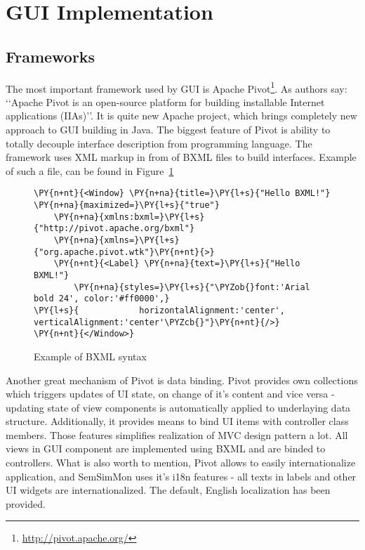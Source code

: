 \section{GUI Implementation}

\subsection{Frameworks}

The most important framework used by GUI is Apache Pivot\footnote{\url{http://pivot.apache.org/}}. As authors say:
\lq\lq{}Apache Pivot is an open-source platform for building installable Internet applications (IIAs)\rq\rq{}. It is quite new Apache
project, which brings completely new approach to GUI building in Java. The biggest feature of Pivot is ability to totally
decouple interface description from programming language. The framework uses XML markup in from of BXML files to build
interfaces. Example of such a file, can be found in Figure~\ref{fig:bxml_example}
 
\begin{figure}[ht]
  \centering
    
\begin{Verbatim}[commandchars=\\\{\},frame=single,framerule=0.2pt]                                                     
\PY{n+nt}{<Window} \PY{n+na}{title=}\PY{l+s}{"Hello BXML!"} \PY{n+na}{maximized=}\PY{l+s}{"true"}                      
    \PY{n+na}{xmlns:bxml=}\PY{l+s}{"http://pivot.apache.org/bxml"}                                                      
    \PY{n+na}{xmlns=}\PY{l+s}{"org.apache.pivot.wtk"}\PY{n+nt}{>}                                                       
    \PY{n+nt}{<Label} \PY{n+na}{text=}\PY{l+s}{"Hello BXML!"}                                                           
        \PY{n+na}{styles=}\PY{l+s}{"\PYZob{}font:'Arial bold 24', color:'#ff0000',}                                     
\PY{l+s}{            horizontalAlignment:'center', verticalAlignment:'center'\PYZcb{}"}\PY{n+nt}{/>}                    
\PY{n+nt}{</Window>}                                                                                                    
\end{Verbatim} 
  \caption{Example of BXML syntax}
  \label{fig:bxml_example}
\end{figure}

Another great mechanism of Pivot is data binding. Pivot provides own collections which triggers updates of UI state, on
change of it\rq{}s content and vice versa - updating state of view components is automatically applied to underlaying data structure. Additionally, it provides means to bind UI items with controller class members. Those features simplifies realization of MVC design pattern a lot. All views in GUI component are implemented using BXML and are binded to controllers. What is also worth to mention, Pivot allows to easily internationalize application, and SemSimMon uses it's i18n features - all texts in labels and other UI widgets are internationalized. The default, English localization has been provided.

